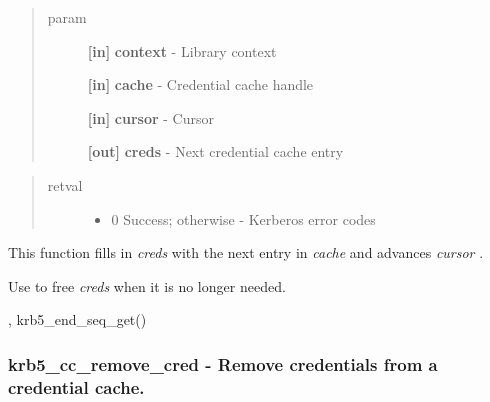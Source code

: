 \documentclass[letterpaper,10pt,english]{sphinxmanual}
\begin{document}
\begin{quote}\begin{description}
\item[{param}] \leavevmode
\textbf{{[}in{]}} \textbf{context} - Library context

\textbf{{[}in{]}} \textbf{cache} - Credential cache handle

\textbf{{[}in{]}} \textbf{cursor} - Cursor

\textbf{{[}out{]}} \textbf{creds} - Next credential cache entry

\end{description}\end{quote}
\begin{quote}\begin{description}
\item[{retval}] \leavevmode\begin{itemize}
\item {} 
0   Success; otherwise - Kerberos error codes

\end{itemize}

\end{description}\end{quote}

This function fills in \emph{creds} with the next entry in \emph{cache} and advances \emph{cursor} .

Use {\hyperref[appdev/refs/api/krb5_free_cred_contents:krb5_free_cred_contents]{}} to free \emph{creds} when it is no longer needed.




{\hyperref[appdev/refs/api/krb5_cc_start_seq_get:krb5_cc_start_seq_get]{}} , krb5\_end\_seq\_get()




\subsubsection{krb5\_cc\_remove\_cred -  Remove credentials from a credential cache.}
\label{appdev/refs/api/krb5_cc_remove_cred:krb5-cc-remove-cred-remove-credentials-from-a-credential-cache}\label{appdev/refs/api/krb5_cc_remove_cred::doc}

\begin{fulllineitems}
\label{appdev/refs/api/krb5_cc_remove_cred:krb5_cc_remove_cred}
\end{fulllineitems}
\end{document}
